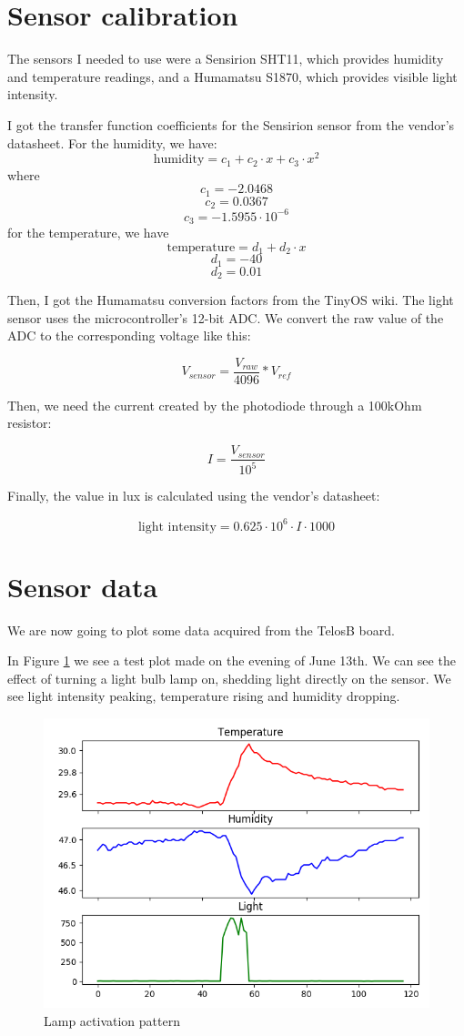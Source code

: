 \documentclass[11pt]{article}
\begin{document}
\section{Sensor calibration}
The sensors I needed to use were a Sensirion SHT11, which provides humidity and temperature readings, and a Humamatsu S1870, which provides visible light intensity. 

I got the transfer function coefficients for the Sensirion sensor from the vendor's datasheet. For the humidity, we have:
$$\text{humidity}=c_1+c_2\cdot x +c_3\cdot x^2$$
where
$$c_1= -2.0468$$
$$c_2=  0.0367$$
$$c_3= -1.5955\cdot10^{-6}$$
for the temperature, we have
$$\text{temperature}=d_1+d_2\cdot x$$ 
$$d_1= -40$$
$$d_2=  0.01$$

Then, I got the Humamatsu conversion factors from the TinyOS wiki. The light sensor uses the microcontroller's 12-bit ADC. We convert the raw value of the ADC to the corresponding voltage like this:

$$ V_{sensor}=\frac{V_{raw}}{4096} * V_{ref} $$ 

Then, we need the current created by the photodiode through a 100kOhm resistor:

$$I = \frac{ V_{sensor} }{10^5}$$

Finally, the value in lux is calculated using the vendor's datasheet: 

$$\text{light intensity} = 0.625\cdot10^6 \cdot I \cdot 1000$$
  

\section{Sensor data}

We are now going to plot some data acquired from the TelosB board.

In Figure \ref{fig:lamp} we see a test plot made on the evening of June 13th. We can see the effect of turning a light bulb lamp on, shedding light directly on the sensor. We see light intensity peaking, temperature rising and humidity dropping.


\begin{figure}[h]
\includegraphics[width=\textwidth]{lamp}
\caption{Lamp activation pattern}
\label{fig:lamp}
\end{figure}
\end{document}

